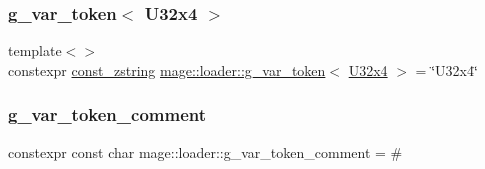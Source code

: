 \mbox{\label{namespacemage_1_1loader_af6edc0f8296394a7e88da46a8720ee9e}} 
\subsubsection{\texorpdfstring{g\+\_\+var\+\_\+token$<$ U32x4 $>$}{g\_var\_token< U32x4 >}}
{\footnotesize\ttfamily template$<$$>$ \\
constexpr \mbox{\hyperlink{namespacemage_abfd9206dc607ceb5d13ec68bf075a5c0}{const\+\_\+zstring}} \mbox{\hyperlink{namespacemage_1_1loader_af955278eb72ed57ce15bc79d4d074b3a}{mage\+::loader\+::g\+\_\+var\+\_\+token}}$<$ \mbox{\hyperlink{namespacemage_a03b5f950ff5769ec16b6acbb9f969856}{U32x4}} $>$ = \char`\"{}U32x4\char`\"{}}

\mbox{\label{namespacemage_1_1loader_a51fd34b486dfe1d203f7c7b897b2fd2c}} 
\subsubsection{\texorpdfstring{g\+\_\+var\+\_\+token\+\_\+comment}{g\_var\_token\_comment}}
{\footnotesize\ttfamily constexpr const char mage\+::loader\+::g\+\_\+var\+\_\+token\+\_\+comment = \textquotesingle{}\#\textquotesingle{}}

